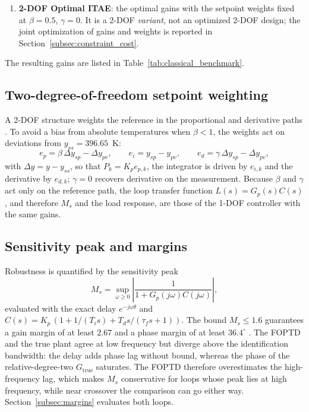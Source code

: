 \begin{enumerate}
    \item \textbf{2-DOF Optimal ITAE}: the optimal gains with the setpoint weights fixed at $\beta = 0.5$, $\gamma = 0$. It is a 2-DOF \emph{variant}, not an optimized 2-DOF design; the joint optimization of gains and weights is reported in Section~\ref{subsec:constraint_cost}.
\end{enumerate}
The resulting gains are listed in Table~\ref{tab:classical_benchmark}.

\subsection{Two-degree-of-freedom setpoint weighting}
\label{subsec:two_dof}
A 2-DOF structure weights the reference in the proportional and derivative paths \cite{astrom2006pid}. To avoid a bias from absolute temperatures when $\beta < 1$, the weights act on deviations from $y_{ss} = 396.65$~K:
\begin{equation}
    e_p = \beta\,\Delta y_{sp} - \Delta y_{pv}, \qquad e_i = y_{sp} - y_{pv}, \qquad e_d = \gamma\,\Delta y_{sp} - \Delta y_{pv},
    \label{eq:two_dof}
\end{equation}
with $\Delta y = y - y_{ss}$, so that $P_k = K_p e_{p,k}$, the integrator is driven by $e_{i,k}$ and the derivative by $e_{d,k}$; $\gamma = 0$ recovers derivative on the measurement. Because $\beta$ and $\gamma$ act only on the reference path, the loop transfer function $L(s) = G_p(s)C(s)$, and therefore $M_s$ and the load response, are those of the 1-DOF controller with the same gains.

\subsection{Sensitivity peak and margins}
\label{subsec:sensitivity_theory}
Robustness is quantified by the sensitivity peak \cite{astrom2006pid, skogestad2005multivariable}
\begin{equation}
    M_s = \sup_{\omega \ge 0} \left|\frac{1}{1 + G_p(j\omega)C(j\omega)}\right|,
    \label{eq:sensitivity_func}
\end{equation}
evaluated with the exact delay $e^{-j\omega\theta}$ and $C(s) = K_p\,(1 + 1/(T_i s) + T_d s/(\tau_f s + 1))$. The bound $M_s \le 1.6$ guarantees a gain margin of at least $2.67$ and a phase margin of at least $36.4^\circ$ \cite{garpinger2014performance, padula2011tuning}. The FOPTD and the true plant agree at low frequency but diverge above the identification bandwidth: the delay adds phase lag without bound, whereas the phase of the relative-degree-two $G_{\text{true}}$ saturates. The FOPTD therefore overestimates the high-frequency lag, which makes $M_s$ conservative for loops whose peak lies at high frequency, while near crossover the comparison can go either way. Section~\ref{subsec:margins} evaluates both loops.
